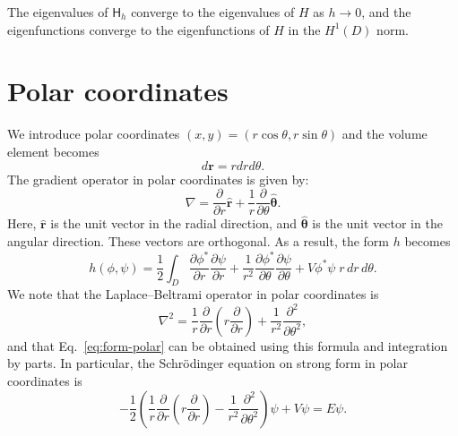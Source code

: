 \documentclass{article}
\newcommand{\pdiff}[2]{\frac{\partial #1}{\partial #2}}
\begin{document}
The eigenvalues of $\mathsf{H}_h$ converge to the eigenvalues of $H$ as $h\to 0$, and the eigenfunctions converge to the eigenfunctions of $H$ in the $H^1(D)$ norm.

\section{Polar coordinates}

We introduce polar coordinates $(x,y) = (r\cos\theta,r\sin\theta)$ and the volume element becomes
\begin{equation}
    d\mathbf{r} = r dr d\theta.
\end{equation}
The gradient operator in polar coordinates is given by:
\begin{equation}
    \nabla = \frac{\partial}{\partial r} \hat{\mathbf{r}} + \frac{1}{r} \frac{\partial}{\partial \theta} \hat{\boldsymbol{\theta}}.
\end{equation}
Here, $\hat{\mathbf{r}}$ is the unit vector in the radial direction, and $\hat{\boldsymbol{\theta}}$ is the unit vector in the angular direction. These vectors are orthogonal. As a result, the form $h$ becomes
\begin{equation}
    h(\phi,\psi) = \frac{1}{2} \int_D \pdiff{\phi^*}{r} \pdiff{\psi}{r} + \frac{1}{r^2} \pdiff{\phi^*}{\theta} \pdiff{\psi}{\theta} + V \phi^* \psi  \; r \, dr \, d\theta. \label{eq:form-polar}
\end{equation}
We note that the Laplace--Beltrami operator in polar coordinates is
\begin{equation}
  \nabla^2 =
\frac{1}{r} \frac{\partial}{\partial r} \left( r \frac{\partial}{\partial r} \right) + \frac{1}{r^2} \frac{\partial^2}{\partial\theta^2},
\end{equation}
and that Eq.~\eqref{eq:form-polar} can be obtained using this formula and integration by parts. In particular, the Schrödinger equation on strong form in polar coordinates is
\begin{equation}
    -\frac{1}{2} \left( \frac{1}{r} \frac{\partial}{\partial r} \left( r \frac{\partial}{\partial r} \right) - \frac{1}{r^2} \frac{\partial^2}{\partial\theta^2} \right) \psi + V \psi = E \psi.
\end{equation}
\end{document}
